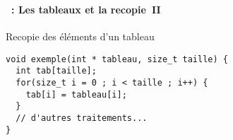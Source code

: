 \begin{frame}[containsverbatim]
  \frametitle{\secname}
  \framesubtitle{\subsecname~: Les tableaux et la recopie~II}

  \begin{exampleblock}{Recopie des éléments d'un tableau}
    \begin{verbatim}
void exemple(int * tableau, size_t taille) {
  int tab[taille];
  for(size_t i = 0 ; i < taille ; i++) {
    tab[i] = tableau[i];
  }
  // d'autres traitements...
}\end{verbatim}
  \end{exampleblock}   
\end{frame}

